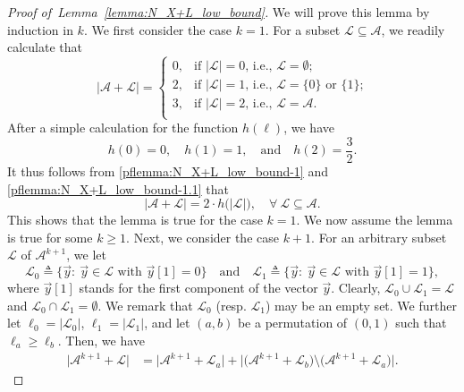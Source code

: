\documentclass[11pt,draftclsnofoot,onecolumn]{IEEEtran}
\begin{document}
\begin{proof}[Proof of~Lemma~\ref{lemma:N_X+L_low_bound}]
We will prove this lemma by induction in $k$. We first consider the case $k=1$.
For a subset $\mathcal{L}\subseteq\mathcal{A}$, we readily calculate that
\begin{equation}
|\mathcal{A}+\mathcal{L}|=
\begin{cases}
 0, & \text{if $|\mathcal{L}|=0$, i.e., $\mathcal{L}=\emptyset$;}\\
 2, & \text{if $|\mathcal{L}|=1$, i.e., $\mathcal{L}=\{0\}$ or $\{1\}$;}\\
 3, & \text{if $|\mathcal{L}|=2$, i.e., $\mathcal{L}=\mathcal{A}$.}\\
\end{cases}\label{pflemma:N_X+L_low_bound-1}
\end{equation}
After a simple calculation for the function $h(\ell)$, we have
\begin{equation}
h(0)=0,\quad h(1)=1,\quad \text{and}\quad h(2)=\frac{3}{2}.\label{pflemma:N_X+L_low_bound-1.1}
\end{equation}
It thus follows from \eqref{pflemma:N_X+L_low_bound-1} and \eqref{pflemma:N_X+L_low_bound-1.1} that
\begin{equation*}
|\mathcal{A}+\mathcal{L}|=2\cdot h\big(|\mathcal{L}|\big),\quad\forall~\mathcal{L}\subseteq\mathcal{A}.
\label{pflemma:N_X+L_low_bound-2}
\end{equation*}
This shows that the lemma is true for the case $k=1$.
We now assume the lemma is true for some $k\geq 1$. Next, we consider the case $k+1$. For an arbitrary subset $\mathcal{L}$ of $\mathcal{A}^{k+1}$, we let
\begin{equation*}
		\mathcal{L}_{0}\triangleq\big\{ \vec{y}:~\text{$\vec{y}\in \mathcal{L}$ with $\vec{y}[1]=0$}\big\}\quad\text{and}\quad\mathcal{L}_{1}\triangleq\big\{ \vec{y}:~\text{$\vec{y}\in \mathcal{L}$ with $\vec{y}[1]=1$}\big\},\label{eq:N_def:L_y}
	\end{equation*}
where $\vec{y}[1]$ stands for the first component of the vector $\vec{y}$.
Clearly, $\mathcal{L}_{0}\cup\mathcal{L}_{1}=\mathcal{L}$ and $\mathcal{L}_{0}\cap\mathcal{L}_{1}=\emptyset$. We remark that  $\mathcal{L}_{0}$ (resp. $\mathcal{L}_{1}$)  may be an empty set. We further let $\ell_{0}=|\mathcal{L}_{0}|$, $\ell_{1}=|\mathcal{L}_{1}|$, and let $(a,b)$ be a permutation of $(0,1)$ such that $\ell_{a}\geq \ell_{b}$. Then, we have
\begin{equation}
\begin{aligned}
\big|\mathcal{A}^{k+1}+\mathcal{L}\big|&= \big|\mathcal{A}^{k+1}+\mathcal{L}_{a}\big|+\big|\big(\mathcal{A}^{k+1}+\mathcal{L}_{b}\big)
\setminus\big(\mathcal{A}^{k+1}+\mathcal{L}_{a}\big)\big|.
\end{aligned}\label{pflemma:N_X+L_low_bound-3}
\end{equation}


\end{proof}
\end{document}
